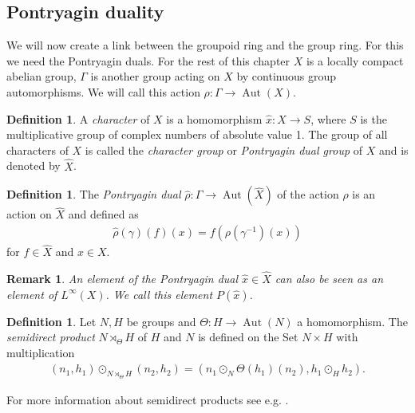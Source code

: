 \documentclass[12pt,a4paper]{scrartcl}
\theoremstyle{plain}
\newtheorem{Remark}[Theorem]{Remark}
\theoremstyle{definition}
\newtheorem{Definition}[Theorem]{Definition}
\numberwithin{equation}{section}
\newcommand{\2}{\mathbb{Z} / 2 \mathbb{Z}}
\newcommand{\1}{\bar{1}}
\newcommand{\0}{\bar{0}}
\newcommand{\Aut}{\operatorname{Aut}}
\begin{document}
\subsection{Pontryagin duality}
We will now create a link between the groupoid ring and the group ring. For this we need the Pontryagin duals. For the rest of this chapter $X$ is a locally compact abelian group, $\Gamma$ is another group acting on $X$ by continuous group automorphisms. We will call this action $\rho\colon\Gamma \to \Aut(X)$.
\begin{Definition}
	A \emph{character} of $X$ is a homomorphism $\hat{x}\colon X \to S$, where $S$ is the multiplicative group of complex numbers of absolute value 1. The group of all characters of $X$ is called the \emph{character group} or \emph{Pontryagin dual group} of $X$ and is denoted by $\hat{X}$.
\end{Definition}
\begin{Definition}
	The \emph{Pontryagin dual} $\hat{\rho}\colon\Gamma \to \Aut(\hat{X})$ of the action $\rho$ is an action on $\hat{X}$ and defined as
	\begin{align*}
		\hat{\rho}(\gamma)(f)(x) = f(\rho(\gamma^{-1})(x))
	\end{align*}
	for $f \in \hat{X}$ and $x \in X$.
\end{Definition}
\begin{Remark}
	An element of the Pontryagin dual $\hat{x} \in \hat{X}$ can also be seen as an element of $L^{\infty}(X)$. We call this element $P(\hat{x})$.
\end{Remark}
\begin{Definition}
	Let $N, H$ be groups and $\Theta \colon H \to \Aut(N)$ a homomorphism. The \emph{semidirect product} $N \rtimes_\Theta H$ of $H$ and $N$ is defined on the Set $N \times H$ with multiplication 
	\begin{align*}
		(n_1, h_1) \odot_{N \rtimes_\Theta H} (n_2, h_2) = (n_1 \odot_N \Theta(h_1)(n_2), h_1 \odot_H h_2).
	\end{align*}
\end{Definition}

For more information about semidirect products see e.g. \cite{ALG}.
\end{document}
